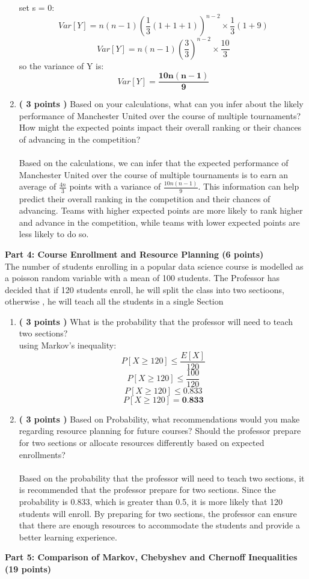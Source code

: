 \documentclass[a3paper,12pt]{extarticle} %
\begin{document}
\begin{enumerate}
\[        \]
        set s = 0:
        \[
        Var[Y] = n(n-1)\left(\frac{1}{3}(1 + 1 + 1)\right)^{n-2} \times \frac{1}{3}(1 + 9)
        \]
        \[
        Var[Y] = n(n-1)\left(\frac{3}{3}\right)^{n-2} \times \frac{10}{3}
        \]
        so the variance of Y is:
        \[
        Var[Y] = \mathbf{\frac{10n(n-1)}{9}}
        \]
        \item \textbf{( 3 points )} Based on your calculations, what can you infer about the likely performance of Manchester United over the course of multiple tournaments? How might the expected points impact their overall ranking or their chances of advancing in the competition?
        \\\\ Based on the calculations, we can infer that the expected performance of Manchester United over the course of multiple tournaments is to earn an average of \(\frac{4n}{3}\) points with a variance of \(\frac{10n(n-1)}{9}\). This information can help predict their overall ranking in the competition and their chances of advancing. Teams with higher expected points are more likely to rank higher and advance in the competition, while teams with lower expected points are less likely to do so.
    \end{enumerate}
    \subitem \textbf{Part 4: Course Enrollment and Resource Planning (6 points)}
    \\ The number of students enrolling in a popular data science course is modelled as a poisson random variable with a mean of 100 students. The Professor has decided that if 120 students enroll, he will split the class into two sectioons, otherwise , he will teach all the students in a single Section
    \begin{enumerate}
        \item \textbf{( 3 points )} What is the probability that the professor will need to teach two sections?
        \\ using Markov's inequality:
        \[
        P[X \geq 120] \leq \frac{E[X]}{120}
        \]
        \[
        P[X \geq 120] \leq \frac{100}{120}
        \]
        \[
        P[X \geq 120] \leq 0.833
        \]
        \[
        P[X \geq 120] = \textbf{0.833}
        \]
        \item \textbf{( 3 points )} Based on Probability, what recommendations would you make regarding resource planning for future courses? Should the professor prepare for two sections or allocate resources differently based on expected enrollments?
        \\\\ Based on the probability that the professor will need to teach two sections, it is recommended that the professor prepare for two sections. Since the probability is 0.833, which is greater than 0.5, it is more likely that 120 students will enroll. By preparing for two sections, the professor can ensure that there are enough resources to accommodate the students and provide a better learning experience.
    \end{enumerate}
    \subitem \textbf{Part 5: Comparison of Markov, Chebyshev and Chernoff Inequalities (19 points)}
    
\end{document}
